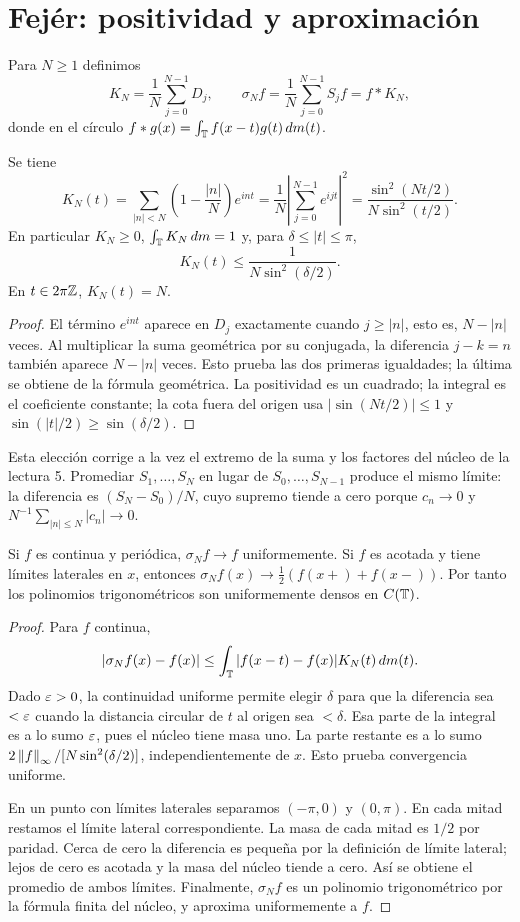 \section{Fejér: positividad y aproximación}\label{v4:fejer-seccion}
\begin{definicion}
Para $N\geq1$ definimos
\[
 K_N=\frac1N\sum_{j=0}^{N-1}D_j,\qquad
 \sigma_Nf=\frac1N\sum_{j=0}^{N-1}S_jf=f*K_N,
\]
donde en el círculo $f*g(x)=\int_\mathbb T f(x-t)g(t)\,dm(t)$.
\end{definicion}
\begin{proposicion}\label{v4:fejer-kernel}
Se tiene
\[
 K_N(t)=\sum_{|n|<N}\left(1-\frac{|n|}N\right)e^{int}
 =\frac1N\left|\sum_{j=0}^{N-1}e^{ijt}\right|^2
 =\frac{\sin^2(Nt/2)}{N\sin^2(t/2)}.
\]
En particular $K_N\geq0$, $\int_\mathbb T K_N\,dm=1$ y, para $\delta\leq|t|\leq\pi$,
\[
 K_N(t)\leq\frac1{N\sin^2(\delta/2)}.
\]
En $t\in2\pi\mathbb Z$, $K_N(t)=N$.
\end{proposicion}
\begin{proof}
El término $e^{int}$ aparece en $D_j$ exactamente cuando $j\geq|n|$, esto es, $N-|n|$ veces. Al multiplicar la suma geométrica por su conjugada, la diferencia $j-k=n$ también aparece $N-|n|$ veces. Esto prueba las dos primeras igualdades; la última se obtiene de la fórmula geométrica. La positividad es un cuadrado; la integral es el coeficiente constante; la cota fuera del origen usa $|\sin(Nt/2)|\leq1$ y $\sin(|t|/2)\geq\sin(\delta/2)$.
\end{proof}
Esta elección corrige a la vez el extremo de la suma y los factores del núcleo de la lectura 5. Promediar $S_1,\ldots,S_N$ en lugar de $S_0,\ldots,S_{N-1}$ produce el mismo límite: la diferencia es $(S_N-S_0)/N$, cuyo supremo tiende a cero porque $c_n\to0$ y $N^{-1}\sum_{|n|\leq N}|c_n|\to0$.
\begin{teorema}[Fejér]\label{v4:fejer-uniforme}
Si $f$ es continua y periódica, $\sigma_Nf\to f$ uniformemente. Si $f$ es acotada y tiene límites laterales en $x$, entonces $\sigma_Nf(x)\to\tfrac12(f(x+)+f(x-))$. Por tanto los polinomios trigonométricos son uniformemente densos en $C(\mathbb T)$.
\end{teorema}
\begin{proof}
Para $f$ continua,
\[
 |\sigma_Nf(x)-f(x)|\leq\int_\mathbb T|f(x-t)-f(x)|K_N(t)\,dm(t).
\]
Dado $\varepsilon>0$, la continuidad uniforme permite elegir $\delta$ para que la diferencia sea $<\varepsilon$ cuando la distancia circular de $t$ al origen sea $<\delta$. Esa parte de la integral es a lo sumo $\varepsilon$, pues el núcleo tiene masa uno. La parte restante es a lo sumo $2\left\lVert f\right\rVert_\infty/[N\sin^2(\delta/2)]$, independientemente de $x$. Esto prueba convergencia uniforme.

En un punto con límites laterales separamos $(-\pi,0)$ y $(0,\pi)$. En cada mitad restamos el límite lateral correspondiente. La masa de cada mitad es $1/2$ por paridad. Cerca de cero la diferencia es pequeña por la definición de límite lateral; lejos de cero es acotada y la masa del núcleo tiende a cero. Así se obtiene el promedio de ambos límites. Finalmente, $\sigma_Nf$ es un polinomio trigonométrico por la fórmula finita del núcleo, y aproxima uniformemente a $f$.
\end{proof}
